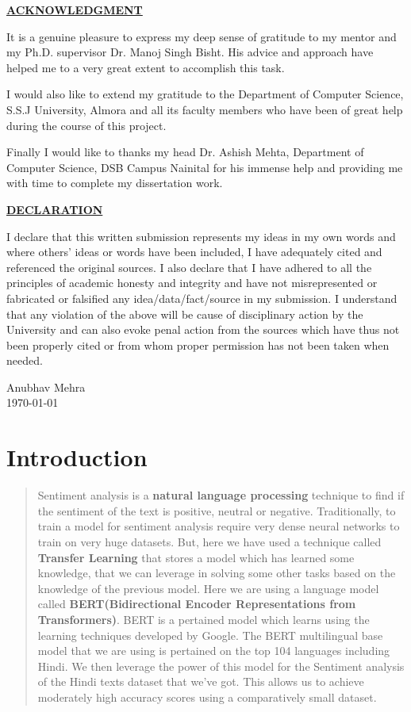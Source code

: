 \documentclass[a4paper, 12pt]{article}
\begin{document}
\begin{sloppypar}
\begin{center}
\textbf{\underline{ACKNOWLEDGMENT}}
\end{center}
It is a genuine pleasure to express my deep sense of gratitude to my mentor and my Ph.D. supervisor Dr. Manoj Singh Bisht. His advice and approach have helped me to a very great extent to accomplish this task. 

I would also like to extend my gratitude to the Department of Computer Science, S.S.J University, Almora and all its faculty members who have been of great help during the course of this project.

Finally I would like to thanks my head Dr. Ashish Mehta, Department of Computer Science, DSB Campus Nainital for his immense help and providing me with time to complete my dissertation work.
\thispagestyle{empty}
\clearpage
\begin{center}
\textbf{\underline{DECLARATION}}
\end{center}
I declare that this written submission represents my ideas in my own words and where others' ideas or words have been included, I have adequately cited and referenced the original sources. I also declare that I have adhered to all the principles of academic honesty and integrity and have not  misrepresented or fabricated or falsified any idea/data/fact/source in my submission. I understand that any violation of the above will be cause of disciplinary action by the University and can also evoke penal action from the sources which have thus not been properly cited or from whom proper permission has not been taken when needed.
\begin{flushright}
Anubhav Mehra \\
\today
\end{flushright}
\thispagestyle{empty}
\clearpage
\tableofcontents
\thispagestyle{empty}
\clearpage
\setcounter{page}{1}
\section{Introduction}
\begin{abstract}
\noindent Sentiment analysis is a \textbf{natural language processing} technique to find if the sentiment of the text is positive, neutral or negative. Traditionally, to train a model for sentiment analysis require very dense neural networks to train on very huge datasets. But, here we have used a technique called \textbf{Transfer Learning} that stores a model which has learned some knowledge, that we can leverage in solving some other tasks based on the knowledge of the previous model. Here we are using a language model called  \textbf{BERT(Bidirectional Encoder Representations from Transformers)}. BERT is a pertained model which learns using the learning techniques developed by Google. The BERT multilingual base model that we are using is pertained on the top 104 languages including Hindi. We then leverage the power of this model for the Sentiment analysis of the Hindi texts dataset that we've got. This allows us to achieve moderately high accuracy scores using a comparatively small dataset.
\end{abstract}


\end{sloppypar}
\end{document}
